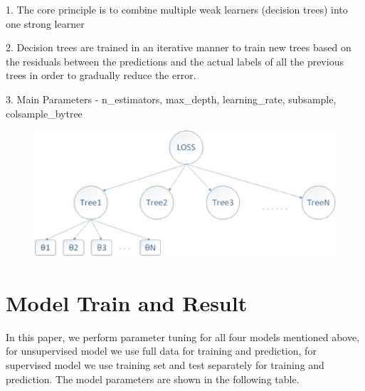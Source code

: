 1. The core principle is to combine multiple weak learners (decision trees) into one
strong learner

2. Decision trees are trained in an iterative manner to train new trees based on the
residuals between the predictions and the actual labels of all the previous trees in
order to gradually reduce the error.

3. Main Parameters - n\_estimators, max\_depth, learning\_rate, subsample,
colsample\_bytree
	\begin{figure}[H]
	\centering
	\includegraphics[scale=0.5]{xgb.eps}
\end{figure}
\section{Model Train and Result} \label{sec-experiment}
In this paper, we perform parameter tuning for all four models mentioned above, for unsupervised model we use full data for training and prediction, for supervised model we use training set and test separately for training and prediction. The model parameters are shown in the following table.

